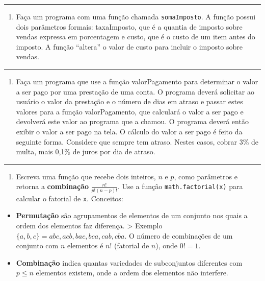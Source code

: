 \documentclass[12pt,a4paper]{article}
\providecommand{\tightlist}{%
      \setlength{\itemsep}{0pt}\setlength{\parskip}{0pt}}
\begin{document}
    \begin{center}\rule{0.5\linewidth}{0.5pt}\end{center}

\begin{enumerate}
\def\labelenumi{\arabic{enumi}.}
\setcounter{enumi}{1}
\tightlist
\item
  Faça um programa com uma função chamada \texttt{somaImposto}. A função
  possui dois parâmetros formais: taxaImposto, que é a quantia de
  imposto sobre vendas expressa em porcentagem e custo, que é o custo de
  um item antes do imposto. A função ``altera'' o valor de custo para
  incluir o imposto sobre vendas.
\end{enumerate}

    \begin{center}\rule{0.5\linewidth}{0.5pt}\end{center}

\begin{enumerate}
\def\labelenumi{\arabic{enumi}.}
\setcounter{enumi}{2}
\tightlist
\item
  Faça um programa que use a função valorPagamento para determinar o
  valor a ser pago por uma prestação de uma conta. O programa deverá
  solicitar ao usuário o valor da prestação e o número de dias em atraso
  e passar estes valores para a função valorPagamento, que calculará o
  valor a ser pago e devolverá este valor ao programa que a chamou. O
  programa deverá então exibir o valor a ser pago na tela. O cálculo do
  valor a ser pago é feito da seguinte forma. Considere que sempre tem
  atraso. Nestes casos, cobrar 3\% de multa, mais 0,1\% de juros por dia
  de atraso.
\end{enumerate}

    \begin{center}\rule{0.5\linewidth}{0.5pt}\end{center}

\begin{enumerate}
\def\labelenumi{\arabic{enumi}.}
\setcounter{enumi}{3}
\tightlist
\item
  Escreva uma função que recebe dois inteiros, \(n\) e \(p\), como
  parâmetros e retorna a \textbf{combinação} \(\frac{n!}{p!(n-p)!}\).
  Use a função \texttt{math.factorial(x)} para calcular o fatorial de
  \texttt{x}. Conceitos:
\end{enumerate}

\begin{itemize}
\tightlist
\item
  \textbf{Permutação} são agrupamentos de elementos de um conjunto nos
  quais a ordem dos elementos faz diferença. \textgreater{} Exemplo
  \(\{a,b,c\} = abc, acb, bac, bca, cab, cba\). O número de combinações
  de um conjunto com \(n\) elementos é \(n!\) (fatorial de \(n\)), onde
  \(0! = 1\).
\item
  \textbf{Combinação} indica quantas variedades de subconjuntos
  diferentes com \(p\leq n\) elementos existem, onde a ordem dos
  elementos não interfere.
\end{itemize}
\end{document}
